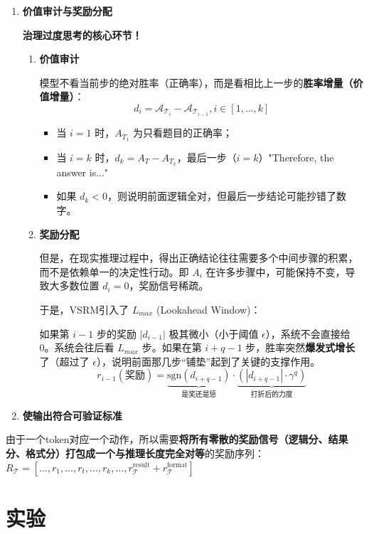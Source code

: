 \documentclass{article}
\begin{document}
\begin{enumerate}
    \item \textbf{价值审计与奖励分配}
    
    \textbf{治理过度思考的核心环节！}
    
    \begin{enumerate}
        \item[(1)] \textbf{价值审计}
        
        模型不看当前步的绝对胜率（正确率），而是看相比上一步的\textbf{胜率增量（价值增量）}：
        \[ d_i = \mathcal{A}_{\mathcal{T}_i} - \mathcal{A}_{\mathcal{T}_{i-1}} , i \in [1, \dots, k] \]
        \begin{itemize}
            \item 当 $i=1$ 时，$A_{T_1}$ 为只看题目的正确率；
            \item 当 $i=k$ 时，$d_k = A_T - A_{T_k}$，最后一步（$i=k$）"Therefore, the answer is..." 
            \item 如果 $d_k < 0$，则说明前面逻辑全对，但最后一步结论可能抄错了数字。
        \end{itemize}

        \item[(2)] \textbf{奖励分配}
        
        但是，在现实推理过程中，得出正确结论往往需要多个中间步骤的积累，而不是依赖单一的决定性行动。即 $A_i$ 在许多步骤中，可能保持不变，导致大多数位置 $d_i=0$，奖励信号稀疏。
        
        于是，VSRM引入了 $L_{max}$ (Lookahead Window)：
        
        如果第 $i-1$ 步的奖励 $|d_{i-1}|$ 极其微小（小于阈值 $\epsilon$），系统不会直接给 0。系统会往后看 $L_{max}$ 步。如果在第 $i+q-1$ 步，胜率突然\textbf{爆发式增长}了（超过了 $\epsilon$），说明前面那几步“铺垫”起到了关键的支撑作用。
        \[ r_{i-1} (\text{奖励}) = \underbrace{\text{sgn}(d_{i+q-1})}_{\text{是奖还是惩}} \cdot \underbrace{(|d_{i+q-1}| \cdot \gamma^q)}_{\text{打折后的力度}} \]
    \end{enumerate}

    \item \textbf{使输出符合可验证标准}
\end{enumerate}
由于一个token对应一个动作，所以需要\textbf{\textbf{将所有零散的奖励信号（逻辑分、结果分、格式分）打包成一个}与推理长度完全对等}的奖励序列：$R_{\mathcal{T}} = [\dots, r_1, \dots, r_t, \dots, r_k, \dots, r_{\mathcal{T}}^{\text{result}} + r_{\mathcal{T}}^{\text{format}}]$

\section{实验}
\end{document}
